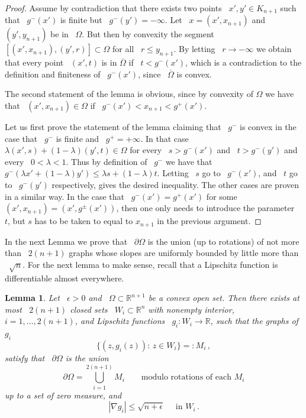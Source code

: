 \documentclass[reqno,12pt]{amsart}
\newcommand{\R}{\mathbb{R}}
\numberwithin{equation}{section}
\theoremstyle{plain}
\newtheorem{lemma}[definition]{Lemma}
\theoremstyle{definition}
\renewcommand{\leq}{\leqslant}
\begin{document}
\begin{proof}
    Assume by contradiction that there exists two points ~$x',y'\in K_{n+1}$ such that ~$g^-(x')$ is finite but ~$g^-(y')=-\infty$. Let ~$x=(x',x_{n+1})$ and ~$(y',y_{n+1})$ be in ~$\Omega.$ But then by convexity the segment ~$[(x',x_{n+1}),(y',r)]\subset\Omega$ for all ~$r\leq y_{n+1}.$  By letting ~$r\to -\infty$ we obtain that every point ~$(x',t)$ is in $\overline{\Omega}$ if ~$t<g^-(x')$, which is a contradiction to the definition and finiteness of ~$g^-(x')$, since ~$\overline{\Omega}$ is convex. 

    The second statement of the lemma is obvious, since by convexity of $\Omega$ we have that ~$(x',x_{n+1})\in \Omega$ if ~$g^-(x')<x_{n+1}<g^+(x')$. 

    Let us first prove the statement of the lemma claiming that ~$g^-$ is convex in the case that ~$g^-$ is finite and ~$g^+=+\infty$. In that case ~$\lambda (x',s)+(1-\lambda)(y',t)\in\Omega$ for every ~$s>g^-(x')$ and ~$t>g^-(y')$ and every ~$0<\lambda<1$. Thus by definition of ~$g^-$ we have that ~$g^-(\lambda x'+(1-\lambda)y')\leq \lambda s+(1-\lambda)t$. Letting ~$s$ go to ~$g^-(x')$, and ~$t$ go to ~$g^-(y')$ respectively, gives the desired inequality. The other cases are proven in a similar way. In the case that ~$g^-(x')=g^+(x')$ for some ~$(x',x_{n+1})=(x',g^{\pm}(x'))$, then one only needs to introduce the parameter ~$t$, but $s$ has to be taken to equal to $x_{n+1}$ in the previous argument.  
\end{proof}

In the next Lemma we prove that ~$\partial\Omega$ is the union (up to rotations) of not more than ~$2(n+1)$ graphs whose slopes are uniformly bounded by little more than ~$\sqrt{n}.$ For the next lemma to make sense, recall that a Lipschitz function is differentiable almost everywhere. 



\begin{lemma}
 \label{gy:lemma:split into Mi}
  Let ~$\epsilon>0$ and ~$\Omega\subset\R^{n+1}$ be a convex open set. Then there exists  at most ~$2(n+1)$ closed sets ~$W_i\subset\R^n$ with nonempty interior, ~$i=1,\ldots,2(n+1)$, and Lipschitz functions ~$g_i:W_i\to \R$, such that the graphs of $g_i$
  $$
    \{(z,g_i(z)):\, z\in W_i\}=:M_i\,,
  $$
  satisfy that ~$\partial\Omega$ is the union 
  $$
    \partial\Omega=\bigcup_{i=1}^{2(n+1)}M_i\qquad\text{modulo rotations of each $M_i$} 
  $$
  up to a set of zero measure,
  and
  $$
    |\nabla g_i|\leq \sqrt{n+\epsilon}\quad\text{ in }W_i\,.
$$
\end{lemma}
\end{document}
